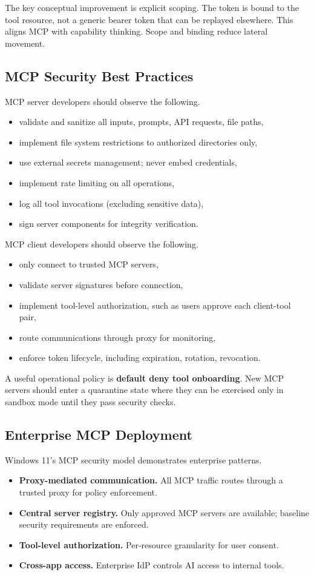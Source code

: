 The key conceptual improvement is explicit scoping. The token is bound to the tool resource, not a generic bearer token that can be replayed elsewhere. This aligns MCP with capability thinking. Scope and binding reduce lateral movement.

\subsection{MCP Security Best Practices}

MCP server developers should observe the following.
\begin{itemize}
\item validate and sanitize all inputs, prompts, API requests, file paths,
\item implement file system restrictions to authorized directories only,
\item use external secrets management; never embed credentials,
\item implement rate limiting on all operations,
\item log all tool invocations (excluding sensitive data),
\item sign server components for integrity verification.
\end{itemize}

MCP client developers should observe the following.
\begin{itemize}
\item only connect to trusted MCP servers,
\item validate server signatures before connection,
\item implement tool-level authorization, such as users approve each client-tool pair,
\item route communications through proxy for monitoring,
\item enforce token lifecycle, including expiration, rotation, revocation.
\end{itemize}

A useful operational policy is \textbf{default deny tool onboarding}. New MCP servers should enter a quarantine state where they can be exercised only in sandbox mode until they pass security checks.

\subsection{Enterprise MCP Deployment}

Windows 11's MCP security model \cite{windowsmcp2025} demonstrates enterprise patterns.
\begin{itemize}
\item \textbf{Proxy-mediated communication.} All MCP traffic routes through a trusted proxy for policy enforcement.
\item \textbf{Central server registry.} Only approved MCP servers are available; baseline security requirements are enforced.
\item \textbf{Tool-level authorization.} Per-resource granularity for user consent.
\item \textbf{Cross-app access.} Enterprise IdP controls AI access to internal tools.
\end{itemize}

